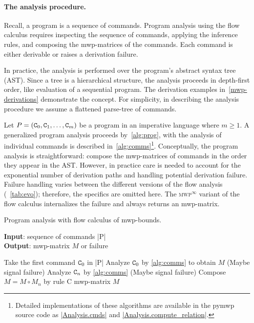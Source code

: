 \paragraph*{The analysis procedure.}
Recall, a program is a sequence of commands.
Program analysis using the flow calculus requires inspecting the sequence of commands,
applying the inference rules, and composing the mwp-matrices of the commands.
Each command is either derivable or raises a derivation failure.

In practice, the analysis is performed over the program's abstract syntax tree (AST).
Since a tree is a hierarchical structure, the analysis proceeds in depth-first order, like evaluation of a sequential program.
The derivation examples in~\autoref{mwp-derivations} demonstrate the concept.
For simplicity, in describing the analysis procedure we assume a flattened parse-tree of commands.

Let \(P = (\prm{C}_0,\prm{C}_1,\ldots,\prm{C}_m) \) be a program in an imperative language where \(m \geq 1\).
A generalized program analysis proceeds by~\autoref{alg:prog}, with the analysis of individual commands is described in~\autoref{alg:comms}\footnote{
    Detailed implementations of these algorithms are available in the pymwp source code as
    \href{https://github.com/statycc/pymwp/blob/40c9ceb644c734f15f82e63edc515716c4f35841/pymwp/analysis.py\#L118}
    {\pr|Analysis.cmds|} and
    \href{https://github.com/statycc/pymwp/blob/40c9ceb644c734f15f82e63edc515716c4f35841/pymwp/analysis.py\#L185}{\pr|Analysis.compute\_relation|}.}.
Conceptually, the program analysis is straightforward: compose the mwp-matrices of commands in the order they appear in the AST\@.
However, in practice care is needed to account for the exponential number of derivation paths
and handling potential derivation failure.
Failure handling varies between the different versions of the flow analysis (\cf~\autoref{tab:evo});
therefore, the specifics are omitted here.
The \textsc{mwp}\(^\infty\) variant of the flow calculus internalizes the failure and always returns an mwp-matrix.

\begin{algorithm}
\caption[Program analysis with flow calculus of mwp-bounds]
{Program analysis with flow calculus of mwp-bounds.}\label{alg:prog}
\textbf{Input}: sequence of commands \pr|P| \\
\textbf{Output}: mwp-matrix \(M\) or failure
\begin{algorithmic}[1]
\State Take the first command \(\prm{C}_0\) in \pr|P|
\State Analyze \(\prm{C}_0\) by \autoref{alg:comms} to obtain \(M\)
\State (Maybe signal failure)
\State Analyze \(\prm{C}_n\) by \autoref{alg:comms}
\State (Maybe signal failure)
\State Compose \(M = M \circ M_n \) by rule C
\EndFor
\State \Return mwp-matrix \(M\) 
\end{algorithmic}
\end{algorithm}

